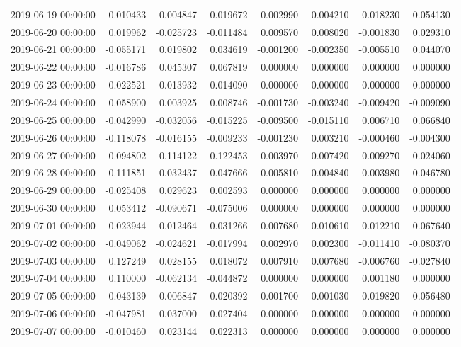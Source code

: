 \begin{tabular}{lrrrrrrr}
2019-06-19 00:00:00 & 0.010433 & 0.004847 & 0.019672 & 0.002990 & 0.004210 & -0.018230 & -0.054130 \\
2019-06-20 00:00:00 & 0.019962 & -0.025723 & -0.011484 & 0.009570 & 0.008020 & -0.001830 & 0.029310 \\
2019-06-21 00:00:00 & -0.055171 & 0.019802 & 0.034619 & -0.001200 & -0.002350 & -0.005510 & 0.044070 \\
2019-06-22 00:00:00 & -0.016786 & 0.045307 & 0.067819 & 0.000000 & 0.000000 & 0.000000 & 0.000000 \\
2019-06-23 00:00:00 & -0.022521 & -0.013932 & -0.014090 & 0.000000 & 0.000000 & 0.000000 & 0.000000 \\
2019-06-24 00:00:00 & 0.058900 & 0.003925 & 0.008746 & -0.001730 & -0.003240 & -0.009420 & -0.009090 \\
2019-06-25 00:00:00 & -0.042990 & -0.032056 & -0.015225 & -0.009500 & -0.015110 & 0.006710 & 0.066840 \\
2019-06-26 00:00:00 & -0.118078 & -0.016155 & -0.009233 & -0.001230 & 0.003210 & -0.000460 & -0.004300 \\
2019-06-27 00:00:00 & -0.094802 & -0.114122 & -0.122453 & 0.003970 & 0.007420 & -0.009270 & -0.024060 \\
2019-06-28 00:00:00 & 0.111851 & 0.032437 & 0.047666 & 0.005810 & 0.004840 & -0.003980 & -0.046780 \\
2019-06-29 00:00:00 & -0.025408 & 0.029623 & 0.002593 & 0.000000 & 0.000000 & 0.000000 & 0.000000 \\
2019-06-30 00:00:00 & 0.053412 & -0.090671 & -0.075006 & 0.000000 & 0.000000 & 0.000000 & 0.000000 \\
2019-07-01 00:00:00 & -0.023944 & 0.012464 & 0.031266 & 0.007680 & 0.010610 & 0.012210 & -0.067640 \\
2019-07-02 00:00:00 & -0.049062 & -0.024621 & -0.017994 & 0.002970 & 0.002300 & -0.011410 & -0.080370 \\
2019-07-03 00:00:00 & 0.127249 & 0.028155 & 0.018072 & 0.007910 & 0.007680 & -0.006760 & -0.027840 \\
2019-07-04 00:00:00 & 0.110000 & -0.062134 & -0.044872 & 0.000000 & 0.000000 & 0.001180 & 0.000000 \\
2019-07-05 00:00:00 & -0.043139 & 0.006847 & -0.020392 & -0.001700 & -0.001030 & 0.019820 & 0.056480 \\
2019-07-06 00:00:00 & -0.047981 & 0.037000 & 0.027404 & 0.000000 & 0.000000 & 0.000000 & 0.000000 \\
2019-07-07 00:00:00 & -0.010460 & 0.023144 & 0.022313 & 0.000000 & 0.000000 & 0.000000 & 0.000000 \\

\end{tabular}
